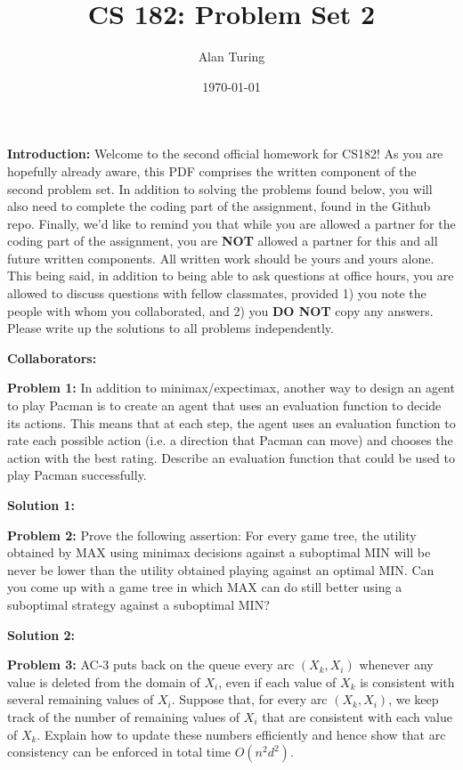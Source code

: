 \documentclass[]{article}
\title{CS 182: Problem Set 2}
\author{Alan Turing}
\date{\today}
\begin{document}
\maketitle

\textbf{Introduction:}  
Welcome to the second official homework for CS182!  As you are hopefully already aware, this PDF comprises the written component of the second problem set.  In addition to solving the problems found below, you will also need to complete the coding part of the assignment, found in the Github repo.  Finally, we'd like to remind you that while you are allowed a partner for the coding part of the assignment, you are \textbf{NOT} allowed a partner for this and all future written components.  All written work should be yours and yours alone.  This being said, in addition to being able to ask questions at office hours, you are allowed to discuss questions with fellow classmates, provided 1) you note the people with whom you collaborated, and 2) you \textbf{DO NOT} copy any answers.  Please write up the solutions to all problems independently.

\bigskip
\textbf{Collaborators:}

\clearpage

\textbf{Problem 1:}
In addition to minimax/expectimax, another way to design an agent to play Pacman is to create an agent that uses an evaluation function to decide its actions. This means that at each step, the agent uses an evaluation function to rate each possible action (i.e. a direction that Pacman can move) and chooses the action with the best rating. Describe an evaluation function that could be used to play Pacman successfully.

\bigskip

\textbf{Solution 1:}

\clearpage

\textbf{Problem 2:}
Prove the following assertion: For every game tree, the utility obtained by MAX using minimax decisions against a suboptimal MIN will be never be lower than the utility obtained playing against an optimal MIN. Can you come up with a game tree in which MAX can do still better using a suboptimal strategy against a suboptimal MIN?

\bigskip

\textbf{Solution 2:}

\clearpage

\textbf{Problem 3:}
AC-3 puts back on the queue every arc $(X_k, X_i)$ whenever any value is deleted from the domain of $X_i$, even if each value of $X_k$ is consistent with several remaining values of $X_i$. Suppose that, for every arc $(X_k, X_i)$, we keep track of the number of remaining values of $X_i$ that are consistent with each value of $X_k$. Explain how to update these numbers efficiently and hence show that arc consistency can be enforced in total time $O(n^2d^2)$.
\end{document}
